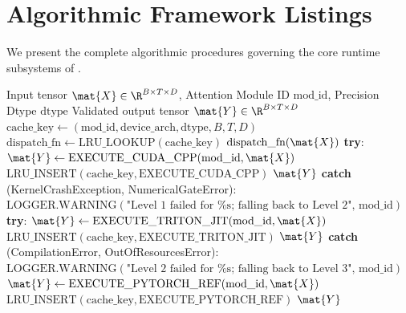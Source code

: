 \section{Algorithmic Framework Listings}
\label{sec:appendix_algorithms}

We present the complete algorithmic procedures governing the core runtime subsystems of \neuralops{}.

\begin{algorithm}[h]
\caption[Zero-Overhead 3-Level Fallback Dispatch with LRU Cache]{Zero-Overhead 3-Level Fallback Dispatch with LRU Cache}
\label{alg:dispatch}
\begin{algorithmic}[1]
\REQUIRE Input tensor $\mat{X} \in \R^{B \times T \times D}$, Attention Module ID $\text{mod\_id}$, Precision Dtype $\text{dtype}$
\ENSURE Validated output tensor $\mat{Y} \in \R^{B \times T \times D}$
\STATE $\text{cache\_key} \leftarrow (\text{mod\_id}, \text{device\_arch}, \text{dtype}, B, T, D)$
\STATE $\text{dispatch\_fn} \leftarrow \text{LRU\_LOOKUP}(\text{cache\_key})$
    \RETURN $\text{dispatch\_fn}(\mat{X})$
\ENDIF
\STATE {}
\STATE \textbf{try}:
    \STATE $\mat{Y} \leftarrow \text{EXECUTE\_CUDA\_CPP}(\text{mod\_id}, \mat{X})$
    \STATE $\text{LRU\_INSERT}(\text{cache\_key}, \text{EXECUTE\_CUDA\_CPP})$
    \RETURN $\mat{Y}$
\ENDIF
\STATE \textbf{catch} (KernelCrashException, NumericalGateError):
\STATE \quad $\text{LOGGER.WARNING}(\text{"Level 1 failed for \%s; falling back to Level 2", mod\_id})$
\STATE {}
\STATE \textbf{try}:
    \STATE $\mat{Y} \leftarrow \text{EXECUTE\_TRITON\_JIT}(\text{mod\_id}, \mat{X})$
    \STATE $\text{LRU\_INSERT}(\text{cache\_key}, \text{EXECUTE\_TRITON\_JIT})$
    \RETURN $\mat{Y}$
\ENDIF
\STATE \textbf{catch} (CompilationError, OutOfResourcesError):
\STATE \quad $\text{LOGGER.WARNING}(\text{"Level 2 failed for \%s; falling back to Level 3", mod\_id})$
\STATE {}
\STATE $\mat{Y} \leftarrow \text{EXECUTE\_PYTORCH\_REF}(\text{mod\_id}, \mat{X})$
\STATE $\text{LRU\_INSERT}(\text{cache\_key}, \text{EXECUTE\_PYTORCH\_REF})$
\RETURN $\mat{Y}$
\end{algorithmic}
\end{algorithm}

